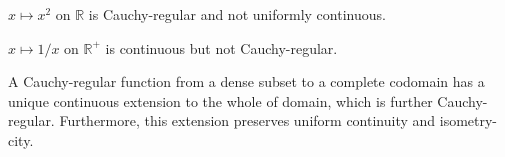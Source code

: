 	\begin{rmk}
		\begin{rmklist}
			\item $x\mapsto x^2$ on $\mathbb R$ is Cauchy-regular and not uniformly continuous.
			
			\item $x\mapsto 1/x$ on $\mathbb R^+$ is continuous but not Cauchy-regular.
		\end{rmklist}
	\end{rmk}
	
	
	\begin{thm}\label{THM: extension of Chauchy-regs}
		A Cauchy-regular function from a dense subset to a complete codomain has a unique continuous extension to the whole of domain, which is further Cauchy-regular. Furthermore, this extension preserves uniform continuity and isometry-city.
	\end{thm}
	
